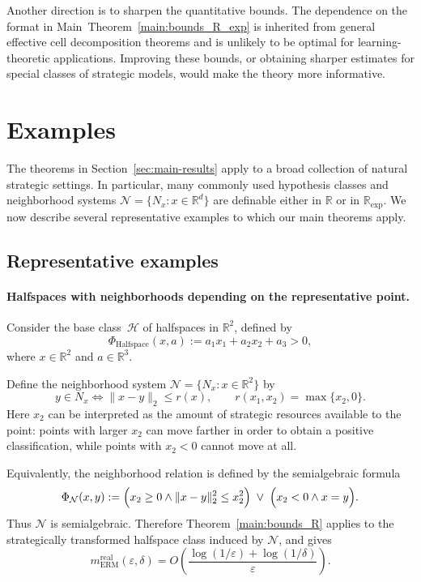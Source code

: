 \documentclass[11pt]{article}
\theoremstyle{plain}
\theoremstyle{definition}
\theoremstyle{remark}
\newcommand{\R}{\mathbb{R}}
\begin{document}
Another direction is to sharpen the quantitative bounds. The dependence on the
format in Main~Theorem~\ref{main:bounds_R_exp} is inherited from general
effective cell decomposition theorems and is unlikely to be optimal for
learning-theoretic applications. Improving these bounds, or obtaining sharper
estimates for special classes of strategic models, would make the theory more
informative.

%

\section{Examples}


\label{sec:examples}


The theorems in Section~\ref{sec:main-results} apply to a broad collection
of natural strategic settings. In particular, many commonly used hypothesis
classes and neighborhood systems
\(
\mathcal N=\{N_x:x\in\R^d\}
\)
are definable either in \(\R\) or in \(\R_{\exp}\). We now describe several representative examples to which our main theorems apply.

\subsection{Representative examples}
\label{sec:examples-representative}

\paragraph{Halfspaces with neighborhoods depending on the representative point.}

Consider the base class~\(\mathcal H\) of halfspaces in \(\R^2\), defined by
\[
  \Phi_{\text{Halfspace}}(x,a)
  :=
  a_1x_1+a_2x_2+a_3>0,
\]
where \(x\in\R^2\) and \(a\in\R^3\).

Define the neighborhood system \(\mathcal N=\{N_x:x\in\R^2\}\) by
\[
  y\in N_x
  \iff
  \|x-y\|_2 \le r(x),
  \qquad
  r(x_1,x_2)=\max\{x_2,0\}.
\]
Here \(x_2\) can be interpreted as the amount of strategic resources available
to the point: points with larger \(x_2\) can move farther in order to obtain a
positive classification, while points with \(x_2<0\) cannot move at all.

Equivalently, the neighborhood relation is defined by the semialgebraic formula
\[
  \Phi_{\mathcal N}(x,y)
  :=
  \Bigl(x_2\ge 0 \wedge \|x-y\|_2^2\le x_2^2\Bigr)
  \;\vee\;
  \Bigl(x_2<0 \wedge x=y\Bigr).
\]
Thus \(\mathcal N\) is semialgebraic. Therefore
Theorem~\ref{main:bounds_R} applies to the strategically transformed
halfspace class induced by \(\mathcal N\), and gives
\[
  m_{\mathrm{ERM}}^{\mathrm{real}}(\varepsilon,\delta)
  =
  O\left(
    \frac{\log(1/\varepsilon)+\log(1/\delta)}{\varepsilon}
  \right).
\]
\end{document}
